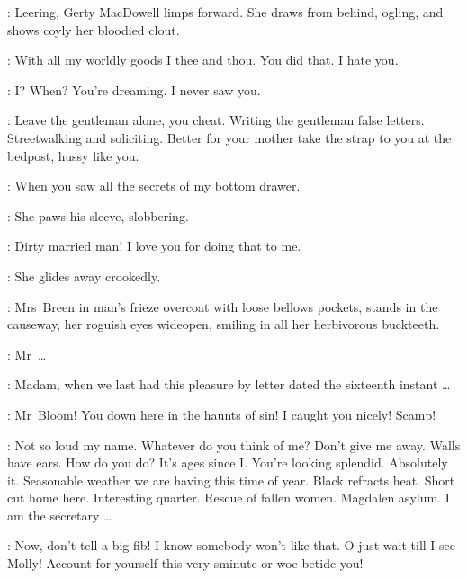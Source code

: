 :
Leering,
Gerty MacDowell limps forward.
She draws from behind,
ogling,
and shows coyly her bloodied clout.

\Gerty:
With all my worldly goods I thee and thou.
You did that.
I hate you.

\Bloom:
I?
When?
You're dreaming.
I never saw you.

\Bawd:
Leave the gentleman alone,
you cheat.
Writing the gentleman false letters.
Streetwalking and soliciting.
Better for your mother
take the strap to you at the bedpost,
hussy like you.

\Gerty:
\sout{}
When you saw all the secrets of my bottom drawer.

:
She paws his sleeve,
slobbering.

\Gerty:
Dirty married man!
I love you for doing that to me.

:
She glides away crookedly.

:
Mrs~Breen in man's frieze overcoat with loose bellows pockets,
stands in the causeway,
her roguish eyes wideopen,
smiling in all her herbivorous buckteeth.

\MrsBreen:
Mr~\ldots
{}

\Bloom:
Madam,
when we last had this pleasure by letter dated the sixteenth instant \ldots

\MrsBreen:
Mr~Bloom!
You down here in the haunts of sin!
I caught you nicely!
Scamp!

\Bloom:
Not so loud my name.
Whatever do you think of me?
Don't give me away.
Walls have ears.
How do you do?
It's ages since I.
You're looking splendid.
Absolutely it.
Seasonable weather we are having this time of year.
Black refracts heat.
Short cut home here.
Interesting quarter.
Rescue of fallen women.
Magdalen asylum.
I am the secretary \ldots

\MrsBreen:
Now,
don't tell a big fib!
I know somebody won't like that.
O just wait till I see Molly!
Account for yourself this very sminute or woe betide you!

